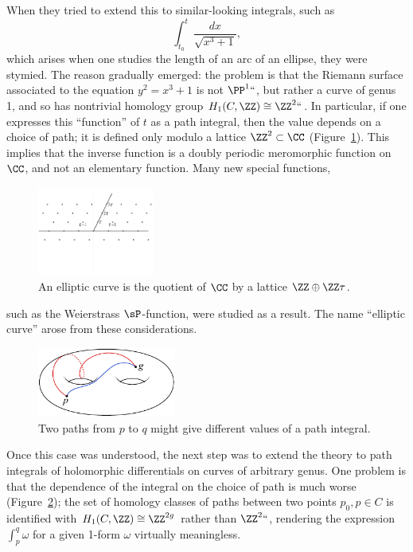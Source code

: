 When they tried to extend this to similar-looking integrals, such as
$$
\int_{t_0}^t \frac{dx}{\sqrt{x^3+1}},
$$
which arises when one studies the length of an arc of an ellipse, they
%
were stymied. The reason gradually emerged: the problem is that the
Riemann surface associated to the equation $y^2 = x^3+1$ is not
$\PP^1` `$, but rather a curve of genus 1, and so has nontrivial
homology group $H_1(C, \ZZ) \cong \ZZ^2` `$. In particular, if one
expresses this ``function'' of $t$  as a path integral, then the value
\vadjust{\goodbreak}%
depends on a choice of path; it is defined only modulo a lattice
$\ZZ^2 \subset \CC$ (Figure~\ref{a lattice}). This implies
that the inverse function is a doubly periodic
%
meromorphic function
on
$\CC$, and not an elementary function. Many new special functions,
%
\begin{figure}
\centerline{\includegraphics[height=1.15in,trim=0 40 0 12,clip]{"main/Fig04-2"}}
\vskip-6pt
\caption{An elliptic curve is the quotient of $\CC$ by a lattice $\ZZ\oplus \ZZ\tau$.}
\label{a lattice}
%
\end{figure}
%
such as the
Weierstrass $\sP$-function,%
%
%
were studied as a result. The name
``elliptic curve''
%
arose from these considerations.

\begin{figure}[b]
\vskip3pt
\includegraphics[height=0.9in]{"main/Fig04-1"}
\vskip-3pt
\caption{Two paths from $p$ to $q$ might give different values of a path integral.}
\label{dependence on path}
\end{figure}

Once this case was understood, the next step was to extend the theory
to
path integrals
%
of
holomorphic differentials
%
on curves of arbitrary
genus. One problem is that the dependence of the integral on the
choice of path is much worse
(Figure~\ref{dependence on path});
the set of homology classes of paths
between two points $p_0, p \in C$ is identified with $H_1(C,\ZZ) \cong
\ZZ^{2g}$ rather than $\ZZ^2` `$, rendering the expression $\int_p^q
\omega$ for a given 1-form $\omega$ virtually meaningless.
{\meshing\par}

